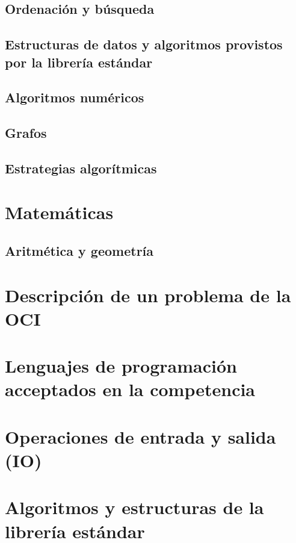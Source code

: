\documentclass{article}
\begin{document}
\subsection{Ordenación y búsqueda}


\subsection{Estructuras de datos y algoritmos provistos por la librería estándar}


\subsection{Algoritmos numéricos}


\subsection{Grafos}


\subsection{Estrategias algorítmicas}


\section{Matemáticas}
\subsection{Aritmética y geometría}



\newpage
\appendix
\section{Descripción de un problema de la OCI}
\label{problem-description}


\section{Lenguajes de programación acceptados en la competencia}
\label{lenguajes}


\section{Operaciones de entrada y salida (IO)}
\label{tech-IO}


\section{Algoritmos y estructuras de la librería estándar}

\end{document}
